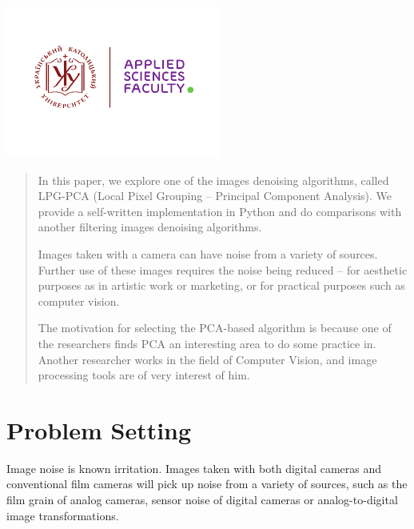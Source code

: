 \begin{titlepage}

\includegraphics[height=5cm]{UCU-Apps.png}\\[1cm] %
 

\vfill %

\end{titlepage}

\begin{abstract}
In this paper, we explore one of the images denoising algorithms, called LPG-PCA (Local Pixel Grouping – Principal Component Analysis). We provide a self-written implementation in Python and do comparisons with another filtering images denoising algorithms. 

Images taken with a camera can have noise from a variety of sources. Further use of these images requires the noise being reduced – for aesthetic purposes as in artistic work or marketing, or for practical purposes such as computer vision. 

The motivation for selecting the PCA-based algorithm is because one of the researchers finds PCA an interesting area to do some practice in. Another researcher works in the field of Computer Vision, and image processing tools are of very interest of him.
\end{abstract}

\section{Problem Setting}
Image noise is known irritation. Images taken with both digital cameras and conventional film cameras will pick up noise from a variety of sources, such as the film grain of analog cameras, sensor noise of digital cameras or analog-to-digital image transformations.  

